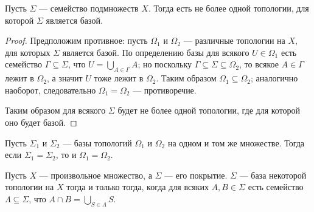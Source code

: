 \documentclass[12pt,a4paper]{article}
\begin{document}
    \begin{theorem}
        Пусть $\Sigma$ --- семейство подмножеств $X$. Тогда есть не более одной топологии, для которой $\Sigma$ является базой.
    \end{theorem}

    \begin{proof}
        Предположим противное: пусть $\Omega_1$ и $\Omega_2$ --- различные топологии на $X$, для которых $\Sigma$ является базой. По определению базы для всякого $U \in \Omega_1$ есть семейство $\Gamma \subseteq \Sigma$, что $U = \bigcup_{A \in \Gamma} A$; но поскольку $\Gamma \subseteq \Sigma \subseteq \Omega_2$, то всякое $A \in \Gamma$ лежит в $\Omega_2$, а значит $U$ тоже лежит в $\Omega_2$. Таким образом $\Omega_1 \subseteq \Omega_2$; аналогично наоборот, следовательно $\Omega_1 = \Omega_2$ --- противоречие.

        Таким образом для всякого $\Sigma$ будет не более одной топологии, где для которой оно будет базой.
    \end{proof}

    \begin{corollary}
        Пусть $\Sigma_1$ и $\Sigma_2$ --- базы топологий $\Omega_1$ и $\Omega_2$ на одном и том же множестве. Тогда если $\Sigma_1 = \Sigma_2$, то и $\Omega_1 = \Omega_2$.
    \end{corollary}

    \begin{theorem}
        Пусть $X$ --- произвольное множество, а $\Sigma$ --- его покрытие. $\Sigma$ --- база некоторой топологии на $X$ тогда и только тогда, когда для всяких $A, B \in \Sigma$ есть семейство $\Lambda \subseteq \Sigma$, что $A \cap B = \bigcup_{S \in \Lambda} S$.
    \end{theorem}
\end{document}
